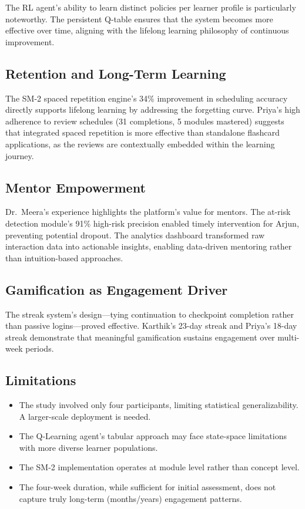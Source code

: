 \documentclass[conference]{IEEEtran}
\begin{document}
The RL agent's ability to learn distinct policies per learner profile is particularly noteworthy. The persistent Q-table ensures that the system becomes more effective over time, aligning with the lifelong learning philosophy of continuous improvement.

\subsection{Retention and Long-Term Learning}

The SM-2 spaced repetition engine's 34\% improvement in scheduling accuracy directly supports lifelong learning by addressing the forgetting curve. Priya's high adherence to review schedules (31 completions, 5 modules mastered) suggests that integrated spaced repetition is more effective than standalone flashcard applications, as the reviews are contextually embedded within the learning journey.

\subsection{Mentor Empowerment}

Dr.~Meera's experience highlights the platform's value for mentors. The at-risk detection module's 91\% high-risk precision enabled timely intervention for Arjun, preventing potential dropout. The analytics dashboard transformed raw interaction data into actionable insights, enabling data-driven mentoring rather than intuition-based approaches.

\subsection{Gamification as Engagement Driver}

The streak system's design---tying continuation to checkpoint completion rather than passive logins---proved effective. Karthik's 23-day streak and Priya's 18-day streak demonstrate that meaningful gamification sustains engagement over multi-week periods.

\subsection{Limitations}

\begin{itemize}
    \item The study involved only four participants, limiting statistical generalizability. A larger-scale deployment is needed.
    \item The Q-Learning agent's tabular approach may face state-space limitations with more diverse learner populations.
    \item The SM-2 implementation operates at module level rather than concept level.
    \item The four-week duration, while sufficient for initial assessment, does not capture truly long-term (months/years) engagement patterns.
\end{itemize}
\end{document}
